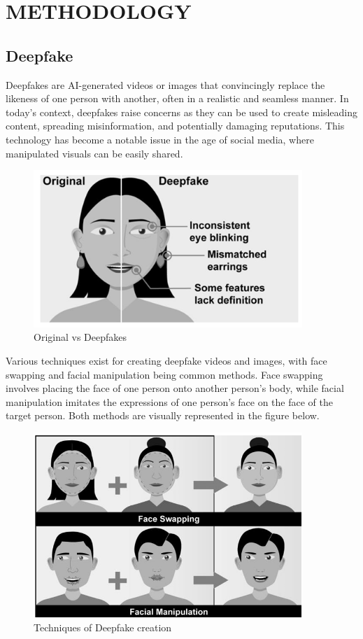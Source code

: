 \section{METHODOLOGY}
\subsection{Deepfake}
Deepfakes are AI-generated videos or images that convincingly replace the likeness of one person with another, often in a realistic and seamless manner. In today's context, deepfakes raise concerns as they can be used to create misleading content, spreading misinformation, and potentially damaging reputations. This technology has become a notable issue in the age of social media, where manipulated visuals can be easily shared.\\

\begin{figure}[htbp]
    \centering
    \includegraphics[width=4in]{img/deefakeface.png}
    \caption{{Original vs Deepfakes }}
\end{figure}

Various techniques exist for creating deepfake videos and images, with face swapping and facial manipulation being common methods. Face swapping involves placing the face of one person onto another person's body, while facial manipulation imitates the expressions of one person's face on the face of the target person. Both methods are visually represented in the figure below.\\

\begin{figure}[htbp]
    \centering
    \includegraphics[width=4in]{img/face manipulation.png}
    \caption{{Techniques of Deepfake creation}}
\end{figure}

\newpage


